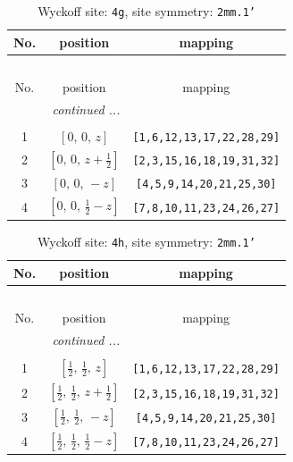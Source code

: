\documentclass[fleqn,8pt]{jsarticle}
\begin{document}
\begin{longtable}{ccc}
\caption{Wyckoff site: {\tt 4g}, site symmetry: {\tt 2mm.1'}}
 \\
 \hline \hline
No. & position & mapping \\ \hline \endfirsthead

\multicolumn{2}{l}{\tablename\ \thetable{}} \\
 \hline \hline
No. & position & mapping \\ \hline \endhead

 \hline \hline
\multicolumn{2}{r}{\footnotesize\it continued ...} \\ \endfoot

 \hline \hline
\multicolumn{2}{r}{} \\ \endlastfoot

1 & $\left[ 0,\, 0,\, z \right]$ & {\tt [1,6,12,13,17,22,28,29]} \\ \hline
2 & $\left[ 0,\, 0,\, z + \frac{1}{2} \right]$ & {\tt [2,3,15,16,18,19,31,32]} \\ \hline
3 & $\left[ 0,\, 0,\, - z \right]$ & {\tt [4,5,9,14,20,21,25,30]} \\ \hline
4 & $\left[ 0,\, 0,\, \frac{1}{2} - z \right]$ & {\tt [7,8,10,11,23,24,26,27]} \\
\end{longtable}
\renewcommand{\arraystretch}{1.2}
\begin{longtable}{ccc}
\caption{Wyckoff site: {\tt 4h}, site symmetry: {\tt 2mm.1'}}
 \\
 \hline \hline
No. & position & mapping \\ \hline \endfirsthead

\multicolumn{2}{l}{\tablename\ \thetable{}} \\
 \hline \hline
No. & position & mapping \\ \hline \endhead

 \hline \hline
\multicolumn{2}{r}{\footnotesize\it continued ...} \\ \endfoot

 \hline \hline
\multicolumn{2}{r}{} \\ \endlastfoot

1 & $\left[ \frac{1}{2},\, \frac{1}{2},\, z \right]$ & {\tt [1,6,12,13,17,22,28,29]} \\ \hline
2 & $\left[ \frac{1}{2},\, \frac{1}{2},\, z + \frac{1}{2} \right]$ & {\tt [2,3,15,16,18,19,31,32]} \\ \hline
3 & $\left[ \frac{1}{2},\, \frac{1}{2},\, - z \right]$ & {\tt [4,5,9,14,20,21,25,30]} \\ \hline
4 & $\left[ \frac{1}{2},\, \frac{1}{2},\, \frac{1}{2} - z \right]$ & {\tt [7,8,10,11,23,24,26,27]} \\
\end{longtable}
\end{document}

